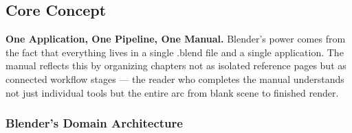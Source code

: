 \documentclass[11pt,letterpaper]{article}
\begin{document}
\subsection{Core Concept}

\textbf{One Application, One Pipeline, One Manual.} Blender's power comes from the fact that everything lives in a single .blend file and a single application. The manual reflects this by organizing chapters not as isolated reference pages but as connected workflow stages --- the reader who completes the manual understands not just individual tools but the entire arc from blank scene to finished render.

\subsubsection{Blender's Domain Architecture}
\end{document}
